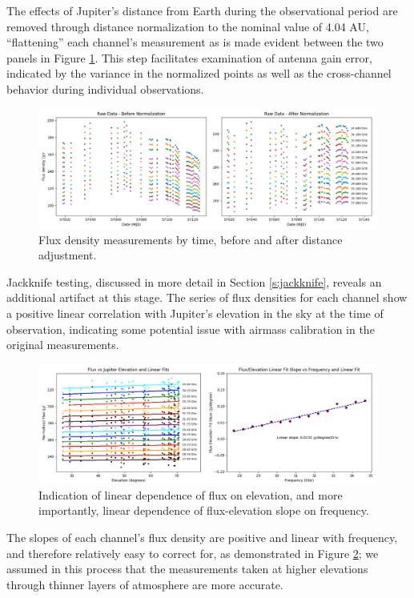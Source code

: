 \documentclass{article}
\begin{document}
	The effects of Jupiter's distance from Earth during the observational period are removed through distance normalization to the nominal value of 4.04 AU, ``flattening'' each channel's measurement as is made evident between the two panels in Figure \ref{fig:raw}.
	This step facilitates examination of antenna gain error, indicated by the variance in the normalized points as well as the cross-channel behavior during individual observations.
	\begin{figure}
		\centering
		\includegraphics[width=\textwidth]{final_raw.png}
		\caption{\label{fig:raw}Flux density measurements by time, before and after distance adjustment.}
	\end{figure}
	Jackknife testing, discussed in more detail in Section \ref{s:jackknife}, reveals an additional artifact at this stage.
	The series of flux densities for each channel show a positive linear correlation with Jupiter's elevation in the sky at the time of observation, indicating some potential issue with airmass calibration in the original measurements.
	\begin{figure}
		\centering
		\includegraphics[width=\textwidth]{final_airmass.png}
		\caption{\label{fig:air}Indication of linear dependence of flux on elevation, and more importantly, linear dependence of flux-elevation slope on frequency.}
	\end{figure}
	The slopes of each channel's flux density are positive and linear with frequency, and therefore relatively easy to correct for, as demonstrated in Figure \ref{fig:air}; we assumed in this process that the measurements taken at higher elevations through thinner layers of atmosphere are more accurate.
\end{document}
